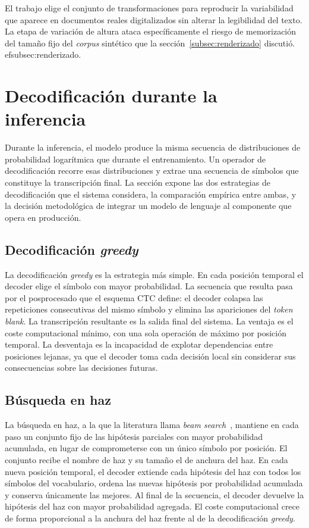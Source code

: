 El trabajo elige el conjunto de transformaciones para reproducir la variabilidad que aparece en documentos reales digitalizados sin alterar la legibilidad del texto. La etapa de variación de altura ataca específicamente el riesgo de memorización del tamaño fijo del \textit{corpus} sintético que la sección~\ref{subsec:renderizado} discutió.
ef{subsec:renderizado}.

\section{Decodificación durante la inferencia}
\label{sec:decodificacion}

Durante la inferencia, el modelo produce la misma secuencia de distribuciones de probabilidad logarítmica que durante el entrenamiento. Un operador de decodificación recorre esas distribuciones y extrae una secuencia de símbolos que constituye la transcripción final. La sección expone las dos estrategias de decodificación que el sistema considera, la comparación empírica entre ambas, y la decisión metodológica de integrar un modelo de lenguaje al componente que opera en producción.

\subsection{Decodificación \textit{greedy}}
\label{subsec:greedy}

La decodificación \textit{greedy} es la estrategia más simple. En cada posición temporal el decoder elige el símbolo con mayor probabilidad. La secuencia que resulta pasa por el posprocesado que el esquema CTC define: el decoder colapsa las repeticiones consecutivas del mismo símbolo y elimina las apariciones del \textit{token blank}. La transcripción resultante es la salida final del sistema. La ventaja es el coste computacional mínimo, con una sola operación de máximo por posición temporal. La desventaja es la incapacidad de explotar dependencias entre posiciones lejanas, ya que el decoder toma cada decisión local sin considerar sus consecuencias sobre las decisiones futuras.

\subsection{Búsqueda en haz}
\label{subsec:beam-search}

La búsqueda en haz, a la que la literatura llama \textit{beam search}~\cite{hannun2014ctcbeam}, mantiene en cada paso un conjunto fijo de las hipótesis parciales con mayor probabilidad acumulada, en lugar de comprometerse con un único símbolo por posición. El conjunto recibe el nombre de haz y su tamaño el de anchura del haz. En cada nueva posición temporal, el decoder extiende cada hipótesis del haz con todos los símbolos del vocabulario, ordena las nuevas hipótesis por probabilidad acumulada y conserva únicamente las mejores. Al final de la secuencia, el decoder devuelve la hipótesis del haz con mayor probabilidad agregada. El coste computacional crece de forma proporcional a la anchura del haz frente al de la decodificación \textit{greedy}.


